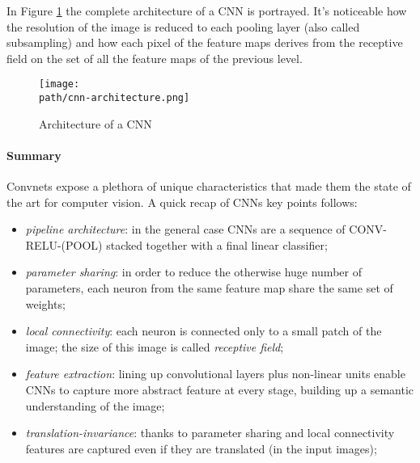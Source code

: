 In Figure \ref{fig:cnn4} the complete architecture of a CNN is portrayed. It's noticeable how the resolution of the image is reduced to each pooling layer (also called subsampling) and how each pixel of the feature maps derives from the receptive field on the set of all the feature maps of the previous level. 


\begin{figure}[h!]
 \centering
 \texttt{[image: \\path/cnn-architecture.png]} 
 \caption{Architecture of a CNN}
 \label{fig:cnn4}
\end{figure}




\paragraph{Summary} \newline 
Convnets expose a plethora of unique characteristics that made them the state of the art for computer vision. A quick recap of CNNs key points follows:

\begin{itemize}
    \item \emph{pipeline architecture}: in the general case CNNs are a sequence of CONV-RELU-(POOL) stacked together with a final linear classifier; 
    
    \item \emph{parameter sharing}: in order to reduce the otherwise huge number of parameters, each neuron from the same feature map share the same set of weights; 
    
    \item \emph{local connectivity}: each neuron is connected only to a small patch of the image; the size of this image is called \emph{receptive field}; 

    
    \item \emph{feature extraction}: lining up convolutional layers plus non-linear units enable CNNs to capture more abstract feature at every stage, building up a semantic understanding of the image; 
        
    \item  \emph{translation-invariance}: thanks to parameter sharing and local connectivity features are captured even if they are translated (in the input images); 
    
\end{itemize}

\newpage

